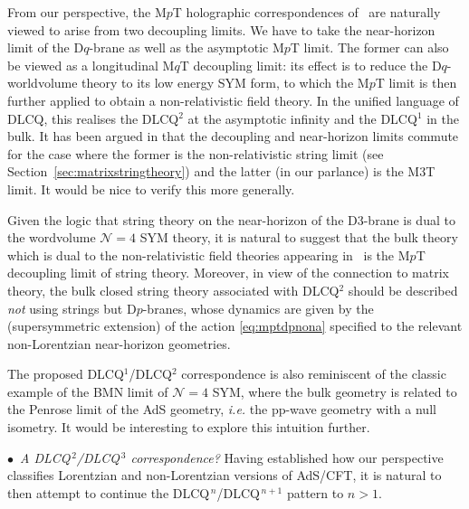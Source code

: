 \documentclass[11pt]{article}
\newcommand{\CN}{\mathcal{N}}
\renewcommand{\emph}[1]{\textit{#1}}
\begin{document}
From our perspective, the M$p$T holographic correspondences of~\cite{Lambert:2024yjk} are naturally viewed to arise from two decoupling limits.
We have to take the near-horizon limit of the D$q$-brane as well as the asymptotic M$p$T limit.
The former can also be viewed as a longitudinal M$q$T decoupling limit: its effect is to reduce the D$q$-worldvolume theory to its low energy SYM form, to which the M$p$T limit is then further applied to obtain a non-relativistic field theory. In the unified language of DLCQ, this realises the DLCQ${}^2$ at the asymptotic infinity and the DLCQ${}^1$ in the bulk. It has been argued in \cite{Fontanella:2024rvn} that the decoupling and near-horizon limits commute for the case where the former is the non-relativistic string limit (see Section~\ref{sec:matrixstringtheory}) and the latter (in our parlance) is the M3T limit. It would be nice to verify this more generally. 

Given the logic that string theory on the near-horizon of the D3-brane is dual to the wordvolume $\CN = 4$ SYM theory, it is natural to suggest that the bulk theory which is dual to the non-relativistic field theories appearing in~\cite{Lambert:2024yjk} is the M$p$T decoupling limit of string theory.
Moreover, in view of the connection to matrix theory, the bulk closed string theory associated with DLCQ${}^2$ should be described \emph{not} using strings but D$p$-branes, whose dynamics are given by the (supersymmetric extension) of the action \eqref{eq:mptdpnona} specified to the relevant non-Lorentzian near-horizon geometries.

The proposed DLCQ${}^1$/DLCQ${}^2$ correspondence is also reminiscent of the classic example of the BMN limit \cite{Berenstein:2002jq} of $\CN = 4$ SYM, where the bulk geometry is related to the Penrose limit of the AdS geometry, \emph{i.e.} the pp-wave geometry with a null isometry. It would be interesting to explore this intuition further.

\vspace{3mm}

\noindent $\bullet$~\emph{A DLCQ${}^{\,2}$/DLCQ${}^{\,3}$ correspondence?} 
Having established how our perspective classifies Lorentzian and non-Lorentzian versions of AdS/CFT, it is natural to then attempt to continue the  DLCQ${}^{\,n}$/DLCQ${}^{\,n+1}$ pattern to $n>1$. 
\end{document}
